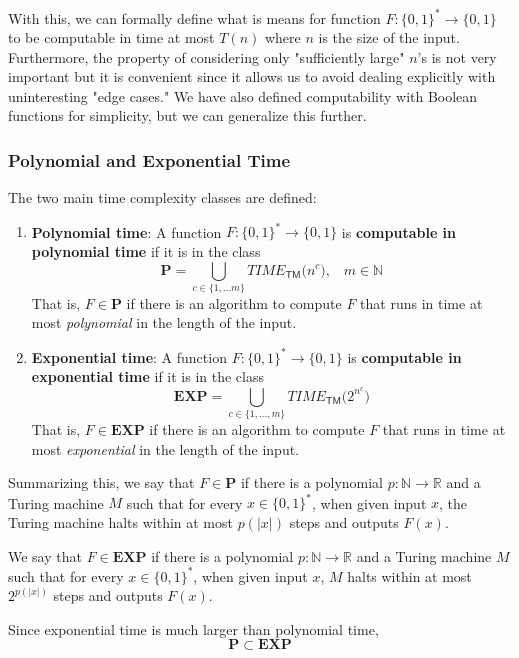 \documentclass{article}
\begin{document}
  With this, we can formally define what is means for function $F: \{0,1\}^* \longrightarrow \{0,1\}$ to be computable in time at most $T(n)$ where $n$ is the size of the input. Furthermore, the property of considering only "sufficiently large" $n$'s is not very important but it is convenient since it allows us to avoid dealing explicitly with uninteresting "edge cases." We have also defined computability with Boolean functions for simplicity, but we can generalize this further. 

  \subsubsection{Polynomial and Exponential Time}
  \begin{definition}
  The two main time complexity classes are defined: 
  \begin{enumerate}
      \item \textbf{Polynomial time}: A function $F: \{0,1\}^* \longrightarrow \{0,1\}$ is \textbf{computable in polynomial time} if it is in the class
      \[\mathbf{P} = \bigcup_{c \in \{1, ...m\}} TIME_{\mathsf{TM}} \big( n^c \big), \;\;\; m \in \mathbb{N}\]
      That is, $F \in \mathbf{P}$ if there is an algorithm to compute $F$ that runs in time at most \textit{polynomial} in the length of the input. 
      \item \textbf{Exponential time}: A function $F: \{0,1\}^* \longrightarrow \{0,1\}$ is \textbf{computable in exponential time} if it is in the class 
      \[\mathbf{EXP} = \bigcup_{c \in \{1, ..., m\}} TIME_{\mathsf{TM}} \big( 2^{n^c}\big)\]
      That is, $F \in \mathbf{EXP}$ if there is an algorithm to compute $F$ that runs in time at most \textit{exponential} in the length of the input. 
  \end{enumerate}
  Summarizing this, we say that $F \in \mathbf{P}$ if there is a polynomial $p: \mathbb{N} \longrightarrow \mathbb{R}$ and a Turing machine $M$ such that for every $x \in \{0,1\}^*$, when given input $x$, the Turing machine halts within at most $p(|x|)$ steps and outputs $F(x)$. 

  We say that $F \in \mathbf{EXP}$ if there is a polynomial $p: \mathbb{N} \longrightarrow \mathbb{R}$ and a Turing machine $M$ such that for every $x \in \{0,1\}^*$, when given input $x$, $M$ halts within at most $2^{p(|x|)}$ steps and outputs $F(x)$. 
  \end{definition}

  \begin{lemma}
  Since exponential time is much larger than polynomial time, 
  \[\mathbf{P} \subset \mathbf{EXP}\]
  \end{lemma}
\end{document}
